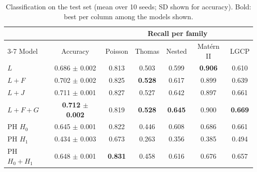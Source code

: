 \documentclass[10pt,a4paper]{article}
\newcommand{\B}[1]{\textbf{#1}}
\begin{document}
\begin{table}[H]
\centering\small
\begin{tabular}{@{}l c ccccc@{}}
\toprule
 & & \multicolumn{5}{c}{Recall per family}\\
\cmidrule(l){3-7}
Model & Accuracy & Poisson & Thomas & Nested & Mat\'ern II & LGCP\\
\midrule
$L$ & 0.686 $\pm$ 0.002 & 0.813 & 0.503 & 0.599 & \B{0.906} & 0.610\\
$L{+}F$ & 0.702 $\pm$ 0.002 & 0.825 & \B{0.528} & 0.617 & 0.899 & 0.639\\
$L{+}J$ & 0.711 $\pm$ 0.001 & 0.827 & 0.527 & 0.642 & 0.897 & 0.661\\
$L{+}F{+}G$ & \B{0.712 $\pm$ 0.002} & 0.819 & \B{0.528} & \B{0.645} & 0.900 & \B{0.669}\\
\midrule
PH $H_0$ & 0.645 $\pm$ 0.001 & 0.822 & 0.446 & 0.608 & 0.686 & 0.661\\
PH $H_1$ & 0.434 $\pm$ 0.003 & 0.673 & 0.263 & 0.356 & 0.385 & 0.494\\
PH $H_0{+}H_1$ & 0.648 $\pm$ 0.001 & \B{0.831} & 0.458 & 0.616 & 0.676 & 0.657\\
\bottomrule
\end{tabular}
\caption{Classification on the test set (mean over 10 seeds; SD shown for accuracy). Bold: best per column among the models shown.}
\label{tab:classify}
\end{table}
\end{document}
